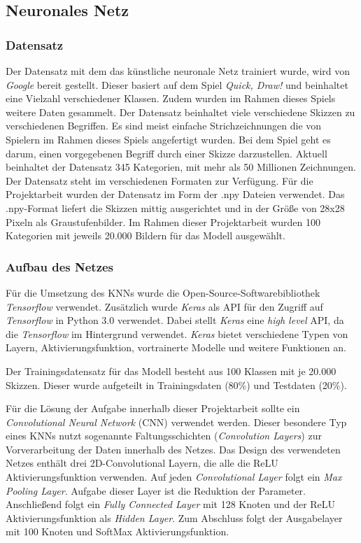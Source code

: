 \documentclass[11pt]{article}
\begin{document}
\newpage
\subsection{Neuronales Netz}
\subsubsection{Datensatz}
Der Datensatz mit dem das künstliche neuronale Netz trainiert wurde, wird von \textit{Google} bereit gestellt. Dieser basiert auf dem Spiel \textit{Quick, Draw!} und beinhaltet eine Vielzahl verschiedener Klassen.  Zudem wurden im Rahmen dieses Spiels weitere Daten gesammelt. Der Datensatz beinhaltet viele verschiedene Skizzen zu verschiedenen Begriffen. Es sind meist einfache Strichzeichnungen die von Spielern im Rahmen dieses Spiels angefertigt wurden. Bei dem Spiel geht es darum, einen vorgegebenen Begriff durch einer Skizze darzustellen. Aktuell beinhaltet der Datensatz 345 Kategorien, mit mehr als 50 Millionen Zeichnungen. Der Datensatz steht im verschiedenen Formaten zur Verfügung.
Für die Projektarbeit wurden der Datensatz im Form der .npy Dateien verwendet. Das .npy-Format liefert die Skizzen mittig ausgerichtet und in der Größe von 28x28 Pixeln als Graustufenbilder.\parencite{GoogleCreativeLab2018}
Im Rahmen dieser Projektarbeit wurden 100 Kategorien mit jeweils 20.000 Bildern für das Modell ausgewählt.

\subsubsection{Aufbau des Netzes}
Für die Umsetzung des KNNs wurde die Open-Source-Softwarebibliothek \textit{Tensorflow} verwendet. Zusätzlich wurde \textit{Keras} als API für den Zugriff auf \textit{Tensorflow} in Python 3.0 verwendet. Dabei stellt \textit{Keras} eine \textit{high level} API, da die \textit{Tensorflow} im Hintergrund verwendet. \textit{Keras} bietet verschiedene Typen von Layern, Aktivierungsfunktion, vortrainerte Modelle und weitere Funktionen an.

Der Trainingsdatensatz für das Modell besteht aus 100 Klassen mit je 20.000 Skizzen. Dieser wurde aufgeteilt in Trainingsdaten (80\%) und Testdaten (20\%).

Für die Lösung der Aufgabe innerhalb dieser Projektarbeit sollte  ein \textit{Convolutional Neural Network} (CNN) verwendet werden. Dieser besondere Typ eines KNNs nutzt sogenannte Faltungsschichten (\textit{Convolution Layers}) zur Vorverarbeitung der Daten innerhalb des Netzes.
Das Design des verwendeten Netzes enthält drei 2D-Convolutional Layern, die alle die ReLU Aktivierungsfunktion verwenden. Auf jeden \textit{Convolutional Layer} folgt ein \textit{Max Pooling Layer}. Aufgabe dieser Layer ist die Reduktion der Parameter. Anschließend folgt ein \textit{Fully Connected Layer} mit 128 Knoten und der ReLU Aktivierungsfunktion als \textit{Hidden Layer}. Zum Abschluss folgt der Ausgabelayer mit 100 Knoten und SoftMax Aktivierungsfunktion.
\end{document}

